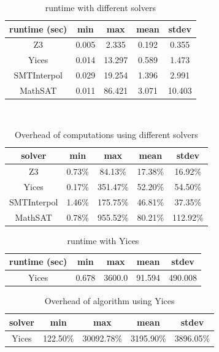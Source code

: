 \begin{table}
  \centering
  \begin{tabular}{ |c||c|c|c|c| }
    \hline
     runtime (sec) & min & max & mean & stdev \\[0.5ex]
    \hline\hline
    Z3   & 0.005 & 2.335 & 0.192 & 0.355 \\[0.5ex]
    Yices &   0.014  & 13.297   & 0.589 & 1.473 \\[0.5ex]
    SMTInterpol& 0.029 & 19.254 &  1.396 & 2.991 \\[0.5ex]
    MathSAT & 0.011 & 86.421 &  3.071 & 10.403 \\[0.5ex]
    \hline
  \end{tabular} \\
  \caption{\ucalg runtime with different solvers}
  \label{tab:runtime-ucalg}
\end{table}

\begin{table}
  \centering
  \begin{tabular}{ |c||c|c|c|c| }
    \hline
     solver & min & max & mean & stdev \\[0.5ex]
    \hline
    Z3   & 0.73\% & 84.13\% & 17.38\% & 16.92\% \\[0.5ex]
    Yices &   0.17\%  & 351.47\%   & 52.20\% & 54.50\% \\[0.5ex]
    SMTInterpol& 1.46\% & 175.75\% &  46.81\% & 37.35\%\\[0.5ex]
    MathSAT & 0.78\% & 955.52\% &  80.21\% & 112.92\%\\[0.5ex]
    \hline
  \end{tabular}
  \caption{Overhead of \ucalg computations using different solvers}
  \label{tab:overhead-ucalg}
\end{table}

\begin{table}
  \centering
  \begin{tabular}{ |c||c|c|c|c| }
    \hline
     runtime (sec) & min & max & mean & stdev \\[0.5ex]
    \hline
    Yices &   0.678  & 3600.0   & 91.594 & 490.008 \\[0.5ex]
    \hline
  \end{tabular}
  \caption{\ucbfalg runtime with Yices}
  \label{tab:runtime-ucbfalg}
\end{table}

\begin{table}
  \centering
  \begin{tabular}{ |c||c|c|c|c| }
    \hline
     solver & min & max & mean & stdev \\[0.5ex]
    \hline
    Yices & 122.50\%  & 30092.78\%   & 3195.90\% & 3896.05\% \\[0.5ex]
    \hline
  \end{tabular}
  \caption{Overhead of \ucbfalg algorithm using Yices}
  \label{tab:overhead-ucbfalg}
\end{table}

